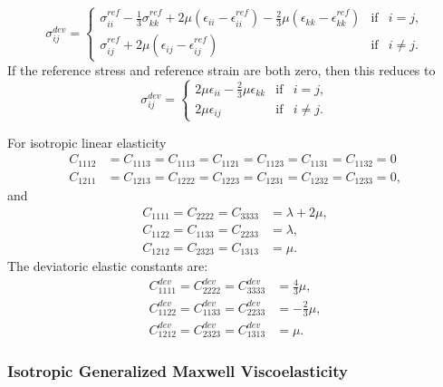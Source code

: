 \begin{equation}
  \boxed{
  \sigma_{ij}^\mathit{dev} = \left\{ \begin{array}{lcr}
      \sigma_{ii}^\mathit{ref} -\frac{1}{3}\sigma_{kk}^\mathit{ref} + 2\mu\left(\epsilon_{ii}-
\epsilon_{ii}
^\mathit{ref}\right) - \frac{2}{3}\mu\left(\epsilon_{kk}-\epsilon_{kk}^\mathit{ref}\right) & 
\text{if} & i = j, \\
      \sigma_{ij}^\mathit{ref} + 2\mu\left(\epsilon_{ij}-\epsilon_{ij}^\mathit{ref}\right) & 
\text{if} & i \neq j.
    \end{array} \right.
}%
\end{equation}
If the reference stress and reference strain are both zero, then this reduces to
\begin{equation}
  \boxed{
  \sigma_{ij}^\mathit{dev} = \left\{ \begin{array}{lcr}
      2\mu\epsilon_{ii} - \frac{2}{3}\mu\epsilon_{kk} & \text{if} & i = j, \\
      2\mu\epsilon_{ij} & \text{if} & i \neq j.
    \end{array} \right.
  }%
\end{equation}

For isotropic linear elasticity
\begin{align}
  C_{1112} &= C_{1113} = C_{1113} = C_{1121} = C_{1123} = C_{1131} = C_{1132} = 0\\
  C_{1211} &= C_{1213} = C_{1222} = C_{1223} = C_{1231} = C_{1232} = C_{1233} = 0,
\end{align}
and
\begin{align}
  C_{1111} = C_{2222} = C_{3333} &= \lambda + 2 \mu, \\
  C_{1122} = C_{1133} = C_{2233} &= \lambda, \\
  C_{1212} = C_{2323} = C_{1313} &= \mu.
\end{align}
The deviatoric elastic constants are:
\begin{align}
  C^\mathit{dev}_{1111} = C^\mathit{dev}_{2222} = C^\mathit{dev}_{3333} &= \frac{4}{3}\mu, \\
  C^\mathit{dev}_{1122} = C^\mathit{dev}_{1133} = C^\mathit{dev}_{2233} &= -\frac{2}{3}\mu, \\
  C^\mathit{dev}_{1212} = C^\mathit{dev}_{2323} = C^\mathit{dev}_{1313} &= \mu.
\end{align}

\subsubsection{Isotropic Generalized Maxwell Viscoelasticity}

